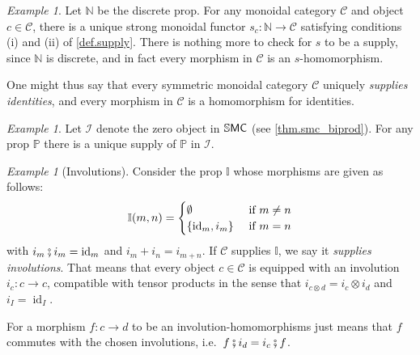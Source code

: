 \documentclass[11pt, oneside, article]{memoir}
\theoremstyle{plain}
\theoremstyle{definition}
\theoremstyle{remark}
\newtheorem{example}[theorem]{Example}
\newcommand{\cat}[1]{\mathcal{#1}}%
\newcommand{\ccat}[1]{\mathbb{#1}}%
\newcommand{\Cat}[1]{{\mathsf{#1}}}%
\newcommand{\CCat}[1]{\mathbb{\StrLeft{#1}{1}}\Cat{\StrGobbleLeft{#1}{1}}}%
\DeclareMathOperator{\id}{id}
\newcommand{\tn}[1]{\textnormal{#1}}
\newcommand{\ssmc}{\CCat{SMC}}
\newcommand{\nn}{\mathbb{N}}
\newcommand{\pp}{\mathbb{P}}
\newcommand{\zero}{\cat{I}}
\newcommand{\cp}{\mathbin{\fatsemi}}
\begin{document}
\begin{example}\label{ex.supply_ids}
Let $\nn$ be the discrete prop. For any monoidal category $\cat{C}$ and object $c\in\cat{C}$, there is a unique strong monoidal functor $s_c\colon\nn\to\cat{C}$ satisfying conditions (i) and (ii) of \cref{def.supply}. There is nothing more to check for $s$ to be a supply, since $\nn$ is discrete, and in fact every morphism in $\cat{C}$ is an $s$-homomorphism. 

One might thus say that every symmetric monoidal category $\cat{C}$ uniquely \emph{supplies identities}, and every morphism in $\cat{C}$ is a homomorphism for identities.
\end{example}

\begin{example}\label{ex.terminal_supply}
Let $\zero$ denote the zero object in $\ssmc$ (see \cref{thm.smc_biprod}). For any prop $\pp$ there is a unique supply of $\pp$ in $\zero$.
\end{example}

\begin{example}[Involutions]\label{ex.supply_involutions}
Consider the prop $\ccat{I}$ whose morphisms are given as follows:
\[
  \ccat{I}(m,n)=
  \begin{cases}
  	\emptyset&\tn{ if }m\neq n\\
		\{\id_m, i_m\}&\tn{ if }m=n
  \end{cases}
 \]
 with $i_m\cp i_m=\id_m$ and $i_m+i_n=i_{m+n}$. If $\cat{C}$ supplies $\ccat{I}$, we say it \emph{supplies involutions}. That means that every object $c\in\cat{C}$ is equipped with an involution $i_c\colon c\to c$, compatible with tensor products in the sense that $i_{c\otimes d}=i_c\otimes i_d$ and $i_I=\id_I$.
 
For a morphism $f\colon c\to d$ to be an involution-homomorphisms just means that $f$ commutes with the chosen involutions, i.e.\ $f\cp i_d=i_c\cp f$.
\end{example}
\end{document}
